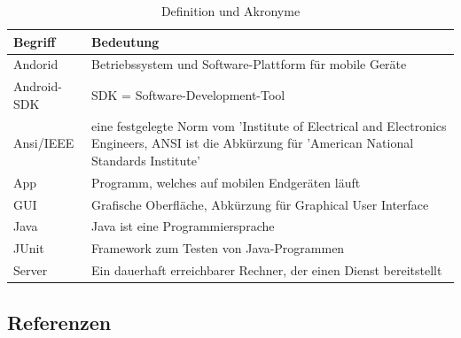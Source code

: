 \documentclass[fontsize=12pt,paper=a4,twoside]{scrartcl}
\begin{document}
\begin{table}[!h]
\caption{Definition und Akronyme}
\centering
\begin{tabular}{p{7cm}|p{7cm}}
\hline Begriff & Bedeutung\\ \hline
\hline Andorid & Betriebssystem und Software-Plattform für mobile Geräte\\
\hline Android-SDK & SDK = Software-Development-Tool\\
\hline Ansi/IEEE & eine festgelegte Norm vom 'Institute of Electrical and Electronics Engineers, ANSI ist die Abkürzung für 'American National Standards Institute'\\
\hline App & Programm, welches auf mobilen Endgeräten läuft\\
\hline GUI & Grafische Oberfläche, Abkürzung für Graphical User Interface\\
\hline Java & Java ist eine Programmiersprache\\
\hline JUnit & Framework zum Testen von Java-Programmen\\
\hline Server & Ein dauerhaft erreichbarer Rechner, der einen Dienst bereitstellt\\
\hline
\end{tabular}
\end{table}

\subsection{Referenzen}
\end{document}
